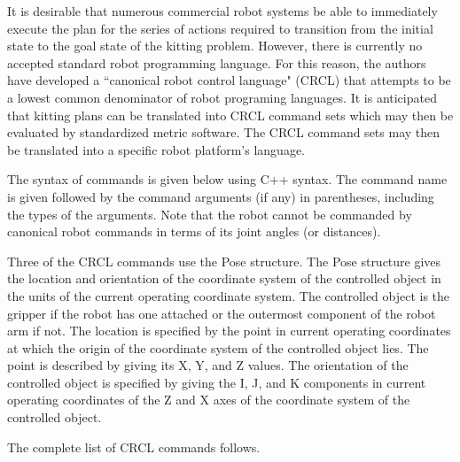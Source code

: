 
It is desirable that numerous commercial robot systems be able to 
immediately execute the plan for the series of actions required to transition from the initial state
to the goal state of the kitting problem. However, there is currently no
accepted standard robot programming language. For this reason, the authors
have developed a ``canonical robot control language" (CRCL) that attempts to be
a lowest common denominator of robot programing languages. It is anticipated
that kitting plans can be translated into  CRCL command sets which may then be
evaluated by standardized metric software. The CRCL command sets may then
be translated into a specific robot platform's language.

The syntax of commands is given below using C++ syntax. The command
name is given followed by the command arguments (if any) in parentheses,
including the types of the arguments.
Note that the robot cannot be commanded by canonical robot commands in
terms of its joint angles (or distances).

Three of the CRCL commands use the Pose structure. The Pose structure gives
the location and orientation of the coordinate system of the controlled
object in the units of the current operating coordinate system. 
The controlled object is the gripper if the robot has one attached
or the outermost component of the robot arm if not.  The location is
specified by the point in current operating coordinates at which the
origin of the coordinate system of the controlled object lies. The point is
described by giving its X, Y, and Z values. The orientation of the
controlled object is specified by giving the I, J, and K components in
current operating coordinates of the Z and X axes of the coordinate
system of the controlled object. 

The complete list of CRCL commands follows.

